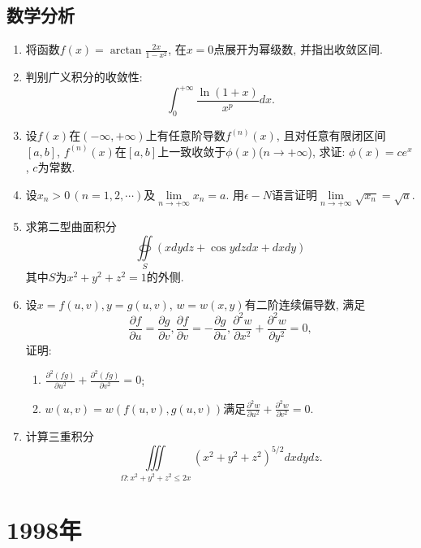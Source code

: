 \documentclass[12pt,a4paper,openany]{book}
\begin{document}
\subsection{数学分析}
\begin{enumerate}
\item 将函数$f(x) = \arctan{\displaystyle\frac{2x}{1 - x^2}}$, 在$x = 0$点展开为幂级数, 并指出收敛区间.

\item 判别广义积分的收敛性:
\[
\int_{0}^{+\infty}{\frac{\ln(1 + x)}{x^p}dx}.
\]

\item 设$f(x)$在$(-\infty, +\infty)$上有任意阶导数$f^{(n)}(x)$, 且对任意有限闭区间$[a, b]$, $f^{(n)}(x)$在$[a, b]$上一致收敛于$\phi(x)$($n \rightarrow +\infty$), 求证: $\phi(x) = ce^x$, $c$为常数.

\item 设$x_n > 0\,(n = 1, 2, \cdots)$及$\lim\limits_{n \rightarrow +\infty}{x_n} = a$. 用$\epsilon-N$语言证明$\lim\limits_{n \rightarrow +\infty}{\sqrt{x_n}} = \sqrt{a}$.

\item 求第二型曲面积分
\[
\oiint\limits_{S}{(xdydz + \cos{y}dzdx + dxdy)}
\]
其中$S$为$x^2 + y^2 + z^2 = 1$的外侧.

\item 设$x = f(u, v), y = g(u, v)$, $w = w(x, y)$有二阶连续偏导数, 满足
\[
\frac{\partial{f}}{\partial{u}} = \frac{\partial{g}}{\partial{v}}, \frac{\partial{f}}{\partial{v}} = -\frac{\partial{g}}{\partial{u}}, \frac{\partial^2{w}}{\partial{x^2}} + \frac{\partial^2{w}}{\partial{y^2}} = 0,
\]
证明:
\begin{enumerate}
\item $\displaystyle\frac{\partial^2(fg)}{\partial{u^2}} + \frac{\partial^2(fg)}{\partial{v^2}} = 0$;
\item $w(u, v) = w(f(u, v), g(u, v))$满足$\displaystyle\frac{\partial^2{w}}{\partial{u^2}} + \frac{\partial^2{w}}{\partial{v^2}} = 0$.
\end{enumerate}

\item 计算三重积分
\[
\iiint\limits_{\varOmega: x^2 + y^2 + z^2 \le 2x}{(x^2 + y^2 + z^2)^{5/2}dxdydz}.
\]

\end{enumerate}

\section{1998年}
\end{document}
